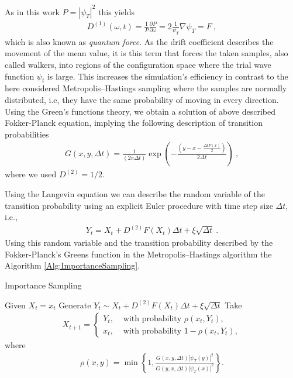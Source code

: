 \documentclass[11pt,a4paper]{article}
\numberwithin{equation}{section}
\begin{document}
As in this work $P = |\psi_T|^2$ this yields
\begin{align*}
D^{(1)}(\omega,t)
=
\frac{1}{P}\frac{\partial P}{\partial \omega}
=
2\frac{1}{\psi_T}\nabla\psi_T = F~,
\end{align*}
which is also known as {\it quantum force}.
%
As the drift coefficient describes the movement of the mean value, it is this term that forces the taken samples, also called walkers, into regions of the configuration space where the trial wave function $\psi_t$ is large.
%
This increases the simulation's efficiency in contrast to the here considered Metropolis--Hastings sampling where the samples are normally distributed, i.e, they have the same probability of moving in every direction.
%
Using the Green's functions theory, we obtain a solution of above described Fokker-Planck equation, implying the following description of transition probabilities 
\begin{align*}
G(x,y,\Delta t)
=
\frac{1}{(2\pi \Delta t)}\exp\left( -\frac{(y-x-\frac{\Delta t F(x)}{2})}{2\Delta t}\right)~,
\end{align*}
where we used $D^{(2)}=1/2$.

%
Using the Langevin equation we can describe the random variable of the transition probability using an explicit Euler procedure with time step size $\Delta t$, i.e.,
\begin{align*}
Y_t = X_t + D^{(2)}F(X_t) \Delta t+ \xi \sqrt{\Delta t}~.
\end{align*}
Using this random variable and the transition probability described by the Fokker-Planck's Greens function in the Metropolis--Hastings algorithm the Algorithm \ref{Alg:ImportanceSampling}.

\begin{algorithm}
	\caption{Importance Sampling}
	\label{Alg:ImportanceSampling}
	\begin{algorithmic}[1]
		\State Given $X_t = x_t$
		\State Generate $Y_t\sim X_t + D^{(2)}F(X_t) \Delta t+ \xi \sqrt{\Delta t}$
		\State Take 
		\begin{align*}
		X_{t+1}=\left\lbrace 
		\begin{aligned}
		Y_t, &\text{ with probability } \rho(x_t,Y_t),\\
		x_t, &\text{ with probability } 1- \rho(x_t,Y_t),
		\end{aligned}
		\right.
		\end{align*}
		where 
		\begin{align*}
		\rho(x,y) = \min\left\lbrace 1, \frac{G(x,y,\Delta t)|\psi_T(y)|^2}{G(y,x,\Delta t)|\psi_T(x)|^2}\right\rbrace.
		\end{align*}
		\EndProcedure
	\end{algorithmic}
\end{algorithm}
\end{document}
